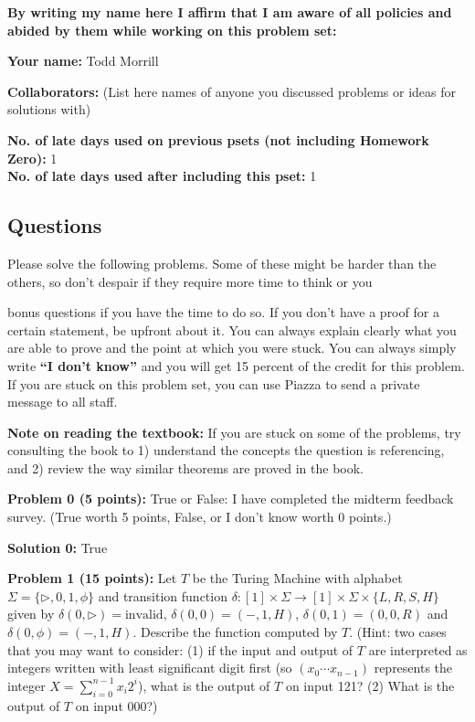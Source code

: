 \documentclass[11pt]{article}
\begin{document}
	\textbf{By writing my name here I affirm that I am aware of all policies
		and abided by them while working on this problem set:}
	
	\textbf{Your name:} Todd Morrill
	
	\textbf{Collaborators:} (List here names of anyone you discussed
	problems or ideas for solutions with)
	
	\textbf{No. of late days used on previous psets (not including Homework Zero): } 1\\
	\textbf{No. of late days used after including this pset: } 1
	
	
	\newpage
	
	\subsection*{Questions}\label{questions}


Please solve the following problems. Some of these might be harder than
the others, so don't despair if they require more time to think or you
 
bonus questions if you have the time to do so. If you don't have a proof
for a certain statement, be upfront about it. You can always explain
clearly what you are able to prove and the point at which you were
stuck. %
You can always simply write
\textbf{``I don't know''} and you will get 15 percent of the credit for
this problem. If you are stuck on this problem set, you can use Piazza to
send a private message to all staff.


\textbf{Note on reading the textbook:} If you are stuck on some of the
problems, try consulting the book to 1) understand the concepts the
question is referencing, and 2) review the way similar theorems are
proved in the book.

\newpage

\textbf{Problem 0 (5 points):} True or False: I have completed the midterm feedback survey. (True worth 5 points, False, or I don't know worth 0 points.)

\textbf{Solution 0:}  True

\newpage

\textbf{Problem 1 (15 points):} Let $T$ be the Turing Machine with alphabet $\Sigma = \{\triangleright, 0,1,\phi\}$ and transition function $\delta:[1] \times \Sigma \to [1] \times \Sigma \times \{L,R,S,H\}$ given by 
$\delta(0,\triangleright) = \mathrm{invalid}$, $\delta(0,0) = (-,1,H)$, $\delta(0,1) = (0,0,R)$ and $\delta(0,\phi)=(-,1,H)$. 
Describe the function computed by $T$. (Hint: two cases that you may want to consider: (1) if the input and output of $T$ are interpreted as integers written with least significant digit first (so $(x_0\cdots x_{n-1})$ represents the integer $X = \sum_{i=0}^{n-1} x_i 2^i$), what is the output of $T$ on input 121? (2) What is the output of $T$ on input 000?)
\end{document}
